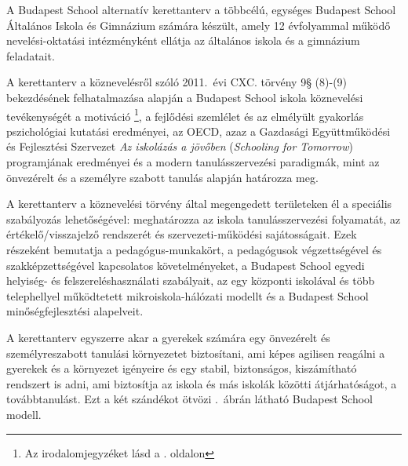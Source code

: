 A Budapest School alternatív kerettanterv a többcélú, egységes	Budapest School Általános Iskola és Gimnázium számára készült, amely 12 évfolyammal működő nevelési-oktatási intézményként ellátja az általános iskola és a gimnázium feladatait.

A kerettanterv a köznevelésről szóló 2011.~évi CXC. törvény 9§ (8)-(9) bekezdésének felhatalmazása alapján a Budapest School iskola köznevelési tevékenységét a motiváció \citep{pink2011drive}\footnote{Az irodalomjegyzéket lásd a \pageref{sec:bibliographyk}. oldalon}, a fejlődési szemlélet \citep{growthmindset} és az elmélyült gyakorlás \citep{ericsson2016peak} pszichológiai kutatási eredményei, az  OECD, azaz a Gazdasági Együttműködési és Fejlesztési Szervezet \emph{Az iskolázás a jövőben}  (\emph{Schooling for Tomorrow}) programjának eredményei \citep{2006schooling} és a modern tanulásszervezési paradigmák, mint az önvezérelt \citep{mitra2012beyond} és a személyre szabott \citep{khan2012one} tanulás alapján határozza meg.

A kerettanterv a köznevelési törvény által megengedett területeken él a speciális szabályozás lehetőségével: meghatározza az iskola tanulásszervezési folyamatát, az értékelő/visszajelző rendszerét és szervezeti-működési sajátosságait. Ezek részeként bemutatja a pedagógus-munkakört, a pedagógusok végzettségével és szakképzettségével kapcsolatos követelményeket, a Budapest School	egyedi helyiség- és felszereléshasználati szabályait, az egy központi iskolával és több telephellyel működtetett mikroiskola-hálózati modellt és a Budapest School minőségfejlesztési alapelveit.

A kerettanterv egyszerre akar a gyerekek számára egy önvezérelt és személyreszabott tanulási környezetet biztosítani, ami képes agilisen reagálni a gyerekek és a környezet igényeire és egy stabil, biztonságos, kiszámítható rendszert is adni, ami biztosítja az iskola és más iskolák közötti átjárhatóságot, a továbbtanulást. Ezt a két szándékot ötvözi .~ábrán látható Budapest School modell.

